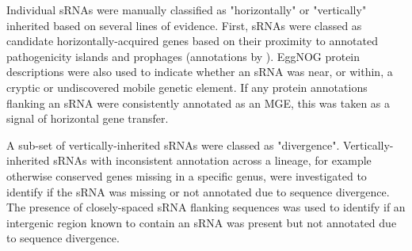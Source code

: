 Individual sRNAs were manually classified as "horizontally" or "vertically" inherited based on several lines of evidence. First, sRNAs were classed as candidate horizontally-acquired genes based on their proximity to annotated pathogenicity islands and prophages (annotations by \cite{Kroger2013-pg,Kroger2012-cr}). EggNOG protein descriptions were also used to indicate whether an sRNA was near, or within, a cryptic or undiscovered mobile genetic element. If any protein annotations flanking an sRNA were consistently annotated as an MGE, this was taken as a signal of horizontal gene transfer.

A sub-set of vertically-inherited sRNAs were classed as "divergence". Vertically-inherited sRNAs with inconsistent annotation across a lineage, for example otherwise conserved genes missing in a specific genus, were investigated to identify if the sRNA was missing or not annotated due to sequence divergence. The presence of closely-spaced sRNA flanking sequences was used to identify if an intergenic region known to contain an sRNA was present but not annotated due to sequence divergence.

